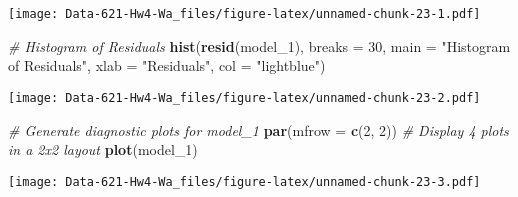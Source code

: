 \documentclass[
]{article}
\newenvironment{Shaded}{\begin{snugshade}}{\end{snugshade}}
\newcommand{\AttributeTok}[1]{\textcolor[rgb]{0.13,0.29,0.53}{#1}}
\newcommand{\CommentTok}[1]{\textcolor[rgb]{0.56,0.35,0.01}{\textit{#1}}}
\newcommand{\DecValTok}[1]{\textcolor[rgb]{0.00,0.00,0.81}{#1}}
\newcommand{\FunctionTok}[1]{\textcolor[rgb]{0.13,0.29,0.53}{\textbf{#1}}}
\newcommand{\NormalTok}[1]{#1}
\newcommand{\SpecialCharTok}[1]{\textcolor[rgb]{0.81,0.36,0.00}{\textbf{#1}}}
\newcommand{\StringTok}[1]{\textcolor[rgb]{0.31,0.60,0.02}{#1}}
\begin{document}
\begin{Shaded}
\end{Shaded}

\texttt{[image: Data-621-Hw4-Wa\_files/figure-latex/unnamed-chunk-23-1.pdf]}

\begin{Shaded}
\begin{Highlighting}[]
\CommentTok{\# Histogram of Residuals}
\FunctionTok{hist}\NormalTok{(}\FunctionTok{resid}\NormalTok{(model\_1), }
     \AttributeTok{breaks =} \DecValTok{30}\NormalTok{, }
     \AttributeTok{main =} \StringTok{"Histogram of Residuals"}\NormalTok{, }
     \AttributeTok{xlab =} \StringTok{"Residuals"}\NormalTok{,}
     \AttributeTok{col =} \StringTok{"lightblue"}\NormalTok{)}
\end{Highlighting}
\end{Shaded}

\texttt{[image: Data-621-Hw4-Wa\_files/figure-latex/unnamed-chunk-23-2.pdf]}

\begin{Shaded}
\begin{Highlighting}[]
\CommentTok{\# Generate diagnostic plots for model\_1}
\FunctionTok{par}\NormalTok{(}\AttributeTok{mfrow =} \FunctionTok{c}\NormalTok{(}\DecValTok{2}\NormalTok{, }\DecValTok{2}\NormalTok{))  }\CommentTok{\# Display 4 plots in a 2x2 layout}
\FunctionTok{plot}\NormalTok{(model\_1)}
\end{Highlighting}
\end{Shaded}

\texttt{[image: Data-621-Hw4-Wa\_files/figure-latex/unnamed-chunk-23-3.pdf]}
\end{document}
